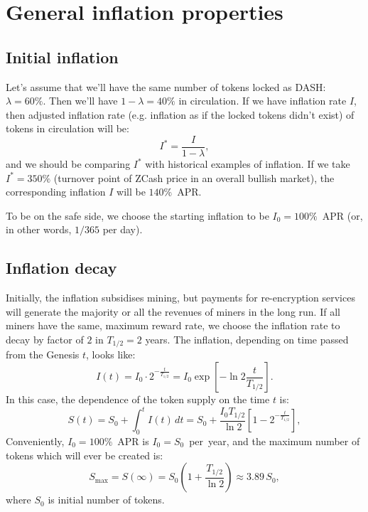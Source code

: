 \documentclass[longbibliography,nofootinbib,twocolumn]{revtex4-1}
\begin{document}
\section{General inflation properties}

\subsection{Initial inflation}

Let's assume that we'll have the same number of tokens locked as DASH: $\lambda=60\%$.
Then we'll have $1-\lambda=40\%$ in circulation.
If we have inflation rate $I$, then adjusted inflation rate (e.g. inflation as if the locked tokens didn't exist) of tokens in circulation will be:
\begin{equation}
    I^* = \frac{I}{1-\lambda},
\end{equation}
and we should be comparing $I^*$ with historical examples of inflation.
If we take $I^*=350\%$ (turnover point of ZCash price in an overall bullish market), the corresponding inflation $I$ will be $140\%$~APR.

To be on the safe side, we choose the starting inflation to be $I_0=100\%$~APR (or, in other words, $1/365$ per day).

\subsection{Inflation decay}

Initially, the inflation subsidises mining, but payments for re-encryption services will generate the majority or all the revenues of miners in the long run.
If all miners have the same, maximum reward rate, we choose the inflation rate to decay by factor of $2$ in $T_{1/2} = 2$ years.
The inflation, depending on time passed from the Genesis $t$, looks like:
\begin{equation}
    I(t) = I_0 \cdot 2^{-\frac{t}{T_{1/2}}} = I_0 \exp\left[ -\ln{2} \frac{t}{T_{1/2}} \right].
\end{equation}
In this case, the dependence of the token supply on the time $t$ is:
\begin{equation}
    \label{eq:supply-time}
    S(t) = S_0 + \int_0^{t} I(t)\, dt = S_0 + \frac{I_0 T_{1/2}}{\ln{2}}\left[1 - 2^{-\frac{t}{T_{1/2}}} \right],
\end{equation}
Conveniently, $I_0=100\%$~APR is $I_0=S_0$~per~year, and the maximum number of tokens which will ever be created is:
\begin{equation}
    S_{\max} = S(\infty) = S_0\left(1 + \frac{T_{1/2}}{\ln{2}}\right) \approx 3.89\, S_0,
\end{equation}
where $S_0$ is initial number of tokens.
\end{document}
